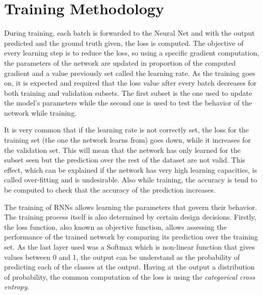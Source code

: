 

\section{Training Methodology}
\label{section:training}

During training, each batch is forwarded to the Neural Net and with the output predicted and the ground truth given, the loss is computed. The objective of every learning step is to reduce the loss, so using a specific gradient computation, the parameters of the network are updated in proportion of the computed gradient and a value previously set called the learning rate. As the training goes on, it is expected and required that the loss value after every batch decreases for both training and validation subsets. The first subset is the one used to update the model's parameters while the second one is used to test the behavior of the network while training.

It is very common that if the learning rate is not correctly set, the loss for the training set (the one the network learns from) goes down, while it increases for the validation set. This will mean that the network has only learned for the subset seen but the prediction over the rest of the dataset are not valid. This effect, which can be explained if the network has very high learning capacities, is called over-fitting and is undesirable. Also while training, the accuracy is tend to be computed to check that the accuracy of the prediction increases.

The training of RNNs allows learning the parameters that govern their behavior. The training process itself is also determined by certain design decisions.
Firstly, the loss function, also known as objective function, allows assessing the performance of the trained network by comparing its prediction over the training set. As the last layer used was a Softmax which is non-linear function that gives values between 0 and 1, the output can be understand as the probability of predicting each of the classes at the output. Having at the output a distribution of probability, the common computation of the loss is using the \textit{categorical cross entropy}.

